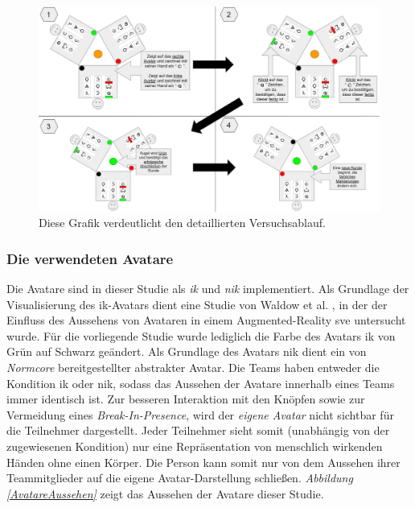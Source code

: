 \documentclass[a4paper,11pt]{article}%
\renewcommand{\\}{\vspace*{0.5\baselineskip} \newline}
\begin{document}
{	\begin{figure}[h]
		\begin{footnotesize}
		\centering
			\includegraphics[scale=0.30]{Abbildungen/DetaillierterVersuchsablauf.JPG}		
			\caption[Darstellung des Versuchsablaufs]{Diese Grafik verdeutlicht den detaillierten Versuchsablauf.}
			\label{DetaillierterVersuchsablauf}
		\end{footnotesize}
	\end{figure}

	\subsubsection{Die verwendeten Avatare}
\label{IKNIK}
Die Avatare sind in dieser Studie als \textit{\ac{ik}} und \textit{\ac{nik}} implementiert. Als Grundlage der Visualisierung des \ac{ik}-Avatars dient eine Studie von Waldow et al. \citep{waldow2019investigating}, in der der Einfluss des Aussehens von Avataren in einem Augmented-Reality \ac{sve} untersucht wurde. Für die vorliegende Studie wurde lediglich die Farbe des Avatars \ac{ik} von Grün auf Schwarz geändert. 
Als Grundlage des Avatars \ac{nik} dient ein von \textit{Normcore} bereitgestellter abstrakter Avatar.
Die Teams haben entweder die Kondition \newline \ac{ik} oder \ac{nik}, sodass das Aussehen der Avatare innerhalb eines Teams immer identisch ist. Zur besseren Interaktion mit den Knöpfen sowie zur Vermeidung eines \textit{Break-In-Presence}, wird der \textit{eigene Avatar} nicht sichtbar für die Teilnehmer dargestellt. Jeder Teilnehmer sieht somit (unabhängig von der zugewiesenen Kondition) nur eine Repräsentation von menschlich wirkenden Händen ohne einen Körper. Die Person kann somit nur von dem Aussehen ihrer Teammitglieder auf die eigene Avatar-Darstellung schließen. \textit{Abbildung \ref{AvatareAussehen}} zeigt das Aussehen der Avatare dieser Studie.

}
\end{document}
